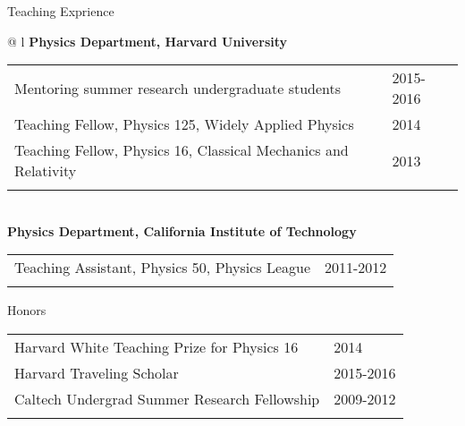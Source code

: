 \documentclass[letterpaper,11pt,oneside]{article}
\begin{document}
\raggedright
 \Large{Teaching Exprience} \\
\vspace{-0.5cm}
 \normalsize
\begin{flushleft}
\hspace{1cm}
 \begin{tabular}{@{} l}
    \textbf{Physics Department, Harvard University} \\ 
    \begin{tabular}{@{} l l }
 Mentoring summer research undergraduate students & 2015-2016\\
 Teaching Fellow, Physics 125, Widely Applied Physics & 2014\\
 Teaching Fellow, Physics 16, Classical Mechanics and Relativity & 2013\\
    \hspace{0.8\linewidth} & \hspace{0.1\linewidth} \\
     \end{tabular}
     \\
     \textbf{Physics Department, California Institute of Technology} \\
     \begin{tabular}{@{} l l }
 Teaching Assistant, Physics 50, Physics League & 2011-2012\\
    \hspace{0.8\linewidth} & \hspace{0.1\linewidth} \\
      \end{tabular}
      \end{tabular}
\end{flushleft}

\raggedright
 \Large{Honors} \\
\vspace{-0.5cm}
 \normalsize
\begin{flushleft}
\hspace{1cm}
\begin{tabular}{@{} l l }
 Harvard White Teaching Prize for Physics 16 & 2014\\
 Harvard Traveling Scholar & 2015-2016\\
 Caltech Undergrad Summer Research Fellowship & 2009-2012\\
    \hspace{0.8\linewidth} & \hspace{0.1\linewidth} \\
 \end{tabular}
\end{flushleft}
\end{document}
